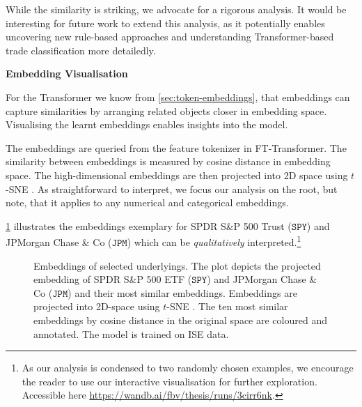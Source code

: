While the similarity is striking, we advocate for a rigorous analysis. It would be interesting for future work to extend this analysis, as it potentially enables uncovering new rule-based approaches and understanding Transformer-based trade classification more detailedly.

\textbf{Embedding Visualisation}

For the Transformer we know from \cref{sec:token-embeddings}, that embeddings can capture similarities by arranging related objects closer in embedding space. Visualising the learnt embeddings enables insights into the model.

The embeddings are queried from the feature tokenizer in FT-Transformer. The similarity between embeddings is measured by cosine distance in embedding space. The high-dimensional embeddings are then projected into 2D space using $t$-SNE \autocite[][2587]{vandermaatenVisualizingDataUsing2008}. As straightforward to interpret, we focus our analysis on the root, but note, that it applies to any numerical and categorical embeddings.

\cref{fig:categorical-embeddings} illustrates the embeddings exemplary for SPDR S\&P 500 Trust ($\mathtt{SPY}$) and JPMorgan Chase \& Co ($\mathtt{JPM}$) which can be \emph{qualitatively} interpreted.\footnote{As our analysis is condensed to two randomly chosen examples, we encourage the reader to use our interactive visualisation for further exploration. Accessible here \url{https://wandb.ai/fbv/thesis/runs/3cirr6nk}.}

\begin{figure}[h!]
    \vfill
    \caption[Embeddings of Selected Underlyings]{Embeddings of selected underlyings. The plot depicts the projected embedding of SPDR S\&P 500 ETF ($\mathtt{SPY}$) and JPMorgan Chase \& Co ($\mathtt{JPM}$) and their most similar embeddings. Embeddings are projected into 2D-space using $t$-SNE \autocite[][2587]{vandermaatenVisualizingDataUsing2008}. The ten most similar embeddings by cosine distance in the original space are coloured and annotated. The model is trained on \gls{ISE} data.}
    \label{fig:categorical-embeddings}
\end{figure}


